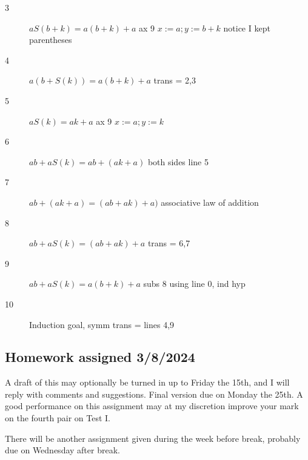 \documentclass[12pt]{article}
\begin{document}
\begin{description}
\begin{description}
\begin{description}
\item[3]  $aS(b+k) = a(b+k)+a$  ax 9 $x:=a; y:=b+k$  notice I kept parentheses

\item[4]  $a(b+S(k)) = a(b+k)+a$ trans = 2,3

\item[5]  $aS(k) = ak+a$  ax 9 $x:=a; y:=k$

\item[6]  $ab+aS(k) = ab+(ak+a)$  both sides line 5

\item[7]  $ab+(ak+a) = (ab+ak)+a)$  associative law of addition

\item[8]  $ab+aS(k) = (ab+ak)+a$   trans = 6,7

\item[9]  $ab+aS(k) = a(b+k)+a$  subs 8 using line 0, ind hyp

\item[10]  Induction goal, symm trans = lines 4,9

\end{description}

\end{description}

\end{description}

\subsection{Homework assigned 3/8/2024}

A draft of this may optionally be turned in up to Friday the 15th, and I will reply with comments and suggestions.  Final version due on Monday the 25th.   A good performance on this assignment may at my discretion improve your mark on the fourth pair on Test I.

There will be another assignment given during the week before break, probably due on Wednesday after break.
\end{document}
